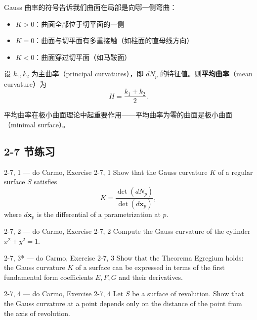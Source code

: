 \begin{Remark}
Gauss 曲率的符号告诉我们曲面在局部是向哪一侧弯曲：
\begin{itemize}
\item $K > 0$：曲面全部位于切平面的一侧
\item $K = 0$：曲面与切平面有多重接触（如柱面的直母线方向）
\item $K < 0$：曲面穿过切平面（如马鞍面）
\end{itemize}
\end{Remark}

\begin{Definition}[平均曲率]\label{def:mean-curvature}
设 $k_1, k_2$ 为主曲率（principal curvatures），即 $dN_p$ 的特征值。则\textbf{\underline{平均曲率}}（mean curvature）为
\[
H = \frac{k_1 + k_2}{2}.
\]
\end{Definition}

平均曲率在极小曲面理论中起重要作用——平均曲率为零的曲面是极小曲面（minimal surface）。

\subsection*{2-7 节练习}

\begin{exercise}{2-7, 1 — do Carmo, Exercise 2-7, 1}
Show that the Gauss curvature $K$ of a regular surface $S$ satisfies
\[
K = \frac{\det(dN_p)}{\det(d\mathbf{x}_p)},
\]
where $d\mathbf{x}_p$ is the differential of a parametrization at $p$.
\end{exercise}

\begin{exercise}{2-7, 2 — do Carmo, Exercise 2-7, 2}
Compute the Gauss curvature of the cylinder $x^2 + y^2 = 1$.
\end{exercise}

\begin{exercise}{2-7, 3* — do Carmo, Exercise 2-7, 3}
Show that the Theorema Egregium holds: the Gauss curvature $K$ of a surface can be expressed in terms of the first fundamental form coefficients $E, F, G$ and their derivatives.
\end{exercise}

\begin{exercise}{2-7, 4 — do Carmo, Exercise 2-7, 4}
Let $S$ be a surface of revolution. Show that the Gauss curvature at a point depends only on the distance of the point from the axis of revolution.
\end{exercise}

